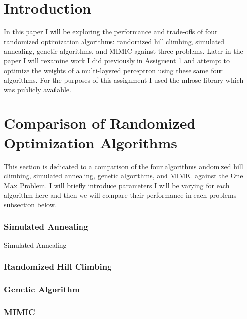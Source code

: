\documentclass[11pt]{article}
\newcommand{\problemone}{One Max Problem}
\begin{document}
    \thispagestyle{firstpage}


    \section{Introduction}
    In this paper I will be exploring the performance and trade-offs of four randomized optimization algorithms: randomized hill climbing,
    simulated annealing, genetic algorithms, and MIMIC against three problems.
    Later in the paper I will rexamine work I did previously in Assigment 1 and attempt to optimize the weights of a multi-layered perceptron using these same
    four algorithms.
    For the purposes of this assignment I used the mlrose library\cite{Hayes19} which was publicly available.


    \section{Comparison of Randomized Optimization Algorithms}
    This section is dedicated to a comparison of the four algorithms andomized hill climbing,
    simulated annealing, genetic algorithms, and MIMIC against the \problemone.
    I will briefly introduce parameters I will be varying for each algorithm here and then we will compare their performance
    in each problems subsection below.
    \subsubsection*{Simulated Annealing}
    Simulated Annealing
    \subsubsection*{Randomized Hill Climbing}
    \subsubsection*{Genetic Algorithm}
    \subsubsection*{MIMIC}
\end{document}
